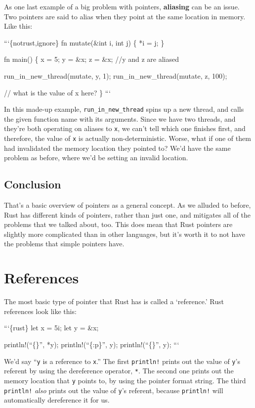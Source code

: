\documentclass[]{article}
\begin{document}
As one last example of a big problem with pointers, \textbf{aliasing}
can be an issue. Two pointers are said to alias when they point at the
same location in memory. Like this:

```\{notrust,ignore\} fn mutate(\&int i, int j) \{ *i = j; \}

fn main() \{ x = 5; y = \&x; z = \&x; //y and z are aliased

run\_in\_new\_thread(mutate, y, 1); run\_in\_new\_thread(mutate, z,
100);

// what is the value of x here? \} ```

In this made-up example, \texttt{run\_in\_new\_thread} spins up a new
thread, and calls the given function name with its arguments. Since we
have two threads, and they're both operating on aliases to \texttt{x},
we can't tell which one finishes first, and therefore, the value of
\texttt{x} is actually non-deterministic. Worse, what if one of them had
invalidated the memory location they pointed to? We'd have the same
problem as before, where we'd be setting an invalid location.

\subsection{Conclusion}\label{conclusion}

That's a basic overview of pointers as a general concept. As we alluded
to before, Rust has different kinds of pointers, rather than just one,
and mitigates all of the problems that we talked about, too. This does
mean that Rust pointers are slightly more complicated than in other
languages, but it's worth it to not have the problems that simple
pointers have.

\section{References}\label{references}

The most basic type of pointer that Rust has is called a `reference.'
Rust references look like this:

```\{rust\} let x = 5i; let y = \&x;

println!(``\{\}'', *y); println!(``\{:p\}'', y); println!(``\{\}'', y);
```

We'd say ``\texttt{y} is a reference to \texttt{x}.'' The first
\texttt{println!} prints out the value of \texttt{y}'s referent by using
the dereference operator, \texttt{*}. The second one prints out the
memory location that \texttt{y} points to, by using the pointer format
string. The third \texttt{println!} \emph{also} prints out the value of
\texttt{y}'s referent, because \texttt{println!} will automatically
dereference it for us.
\end{document}
